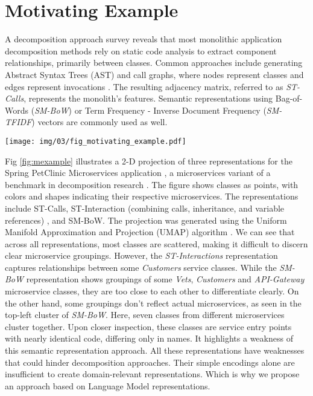 \section{Motivating Example}\label{subsec:mexample}



A decomposition approach survey \cite{Abgaz2023decompsurvey} reveals that most monolithic application decomposition methods rely on static code analysis to extract component relationships, primarily between classes. Common approaches include generating Abstract Syntax Trees (AST) and call graphs, where nodes represent classes and edges represent invocations \cite{khaled2022hydecomp,desai2021cogcn}. The resulting adjacency matrix, referred to as \textit{ST-Calls}, represents the monolith's features. Semantic representations using Bag-of-Words (\textit{SM-BoW}) or Term Frequency - Inverse Document Frequency (\textit{SM-TFIDF}) vectors are commonly used as well.


\begin{figure*}
\centering
\texttt{[image: img/03/fig\_motivating\_example.pdf]}
\caption{A UMAP 2-dimensional projection of calls, interactions and bag-of-words representations.}
\label{fig:mexample}
\end{figure*}


Fig \ref{fig:mexample} illustrates a 2-D projection of three representations for the Spring PetClinic Microservices application \cite{microapps2024petclinic}, a microservices variant of a benchmark in decomposition research \cite{jin2021fosci,khaled2022hydecomp}. The figure shows classes as points, with colors and shapes indicating their respective microservices. The representations include ST-Calls, ST-Interaction (combining calls, inheritance, and variable references) \cite{khaled2022hierdecomp,khaled2022hydecomp}, and SM-BoW. The projection was generated using the Uniform Manifold Approximation and Projection (UMAP) algorithm \cite{mcinnes2020umapuniformmanifoldapproximation}. We can see that across all representations, most classes are scattered, making it difficult to discern clear microservice groupings. However, the \textit{ST-Interactions} representation captures relationships between some \textit{Customers} service classes. While the \textit{SM-BoW} representation shows groupings of some \textit{Vets}, \textit{Customers} and \textit{API-Gateway} microservice classes, they are too close to each other to differentiate clearly.
On the other hand, some groupings don't reflect actual microservices, as seen in the top-left cluster of \textit{SM-BoW}. Here, seven classes from different microservices cluster together. Upon closer inspection, these classes are service entry points with nearly identical code, differing only in names. It highlights a weakness of this semantic representation approach. All these representations have weaknesses that could hinder decomposition approaches. Their simple encodings alone are insufficient to create domain-relevant representations. Which is why we propose an approach based on Language Model representations.

